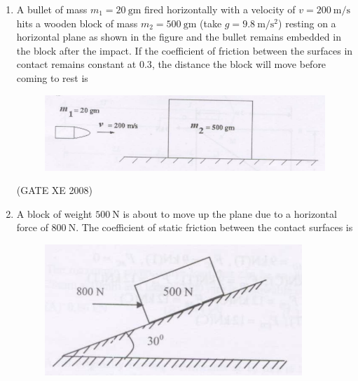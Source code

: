 \documentclass[12pt]{article}
\begin{document}
\begin{enumerate}
\begin{enumerate}
\end{enumerate}
    
    (GATE XE 2008)  

    \item A bullet of mass $m_{1} = 20\ \mathrm{gm}$ fired horizontally with a velocity of $v = 200\ \mathrm{m/s}$ hits a wooden block of mass $m_{2} = 500\ \mathrm{gm}$ (take $g = 9.8\ \mathrm{m/s^{2}}$) resting on a horizontal plane as shown in the figure and the bullet remains embedded in the block after the impact. If the coefficient of friction between the surfaces in contact remains constant at $0.3$, the distance the block will move before coming to rest is 

    \begin{figure}[H]
    \centering
    \includegraphics[width=0.7\columnwidth]{figs/ass1_f_q21.png}
    \caption{}
    \end{figure}

\begin{enumerate}
\end{enumerate}
    
    (GATE XE 2008)  

    \item A block of weight $500\ \mathrm{N}$ is about to move up the plane due to a horizontal force of $800\ \mathrm{N}$. The coefficient of static friction between the contact surfaces is 

    \begin{figure}[H]
    \centering
    \includegraphics[width=0.5\columnwidth]{figs/ass1_f_q22.png}
    \caption{}
    \end{figure}


\end{enumerate}
\end{document}
